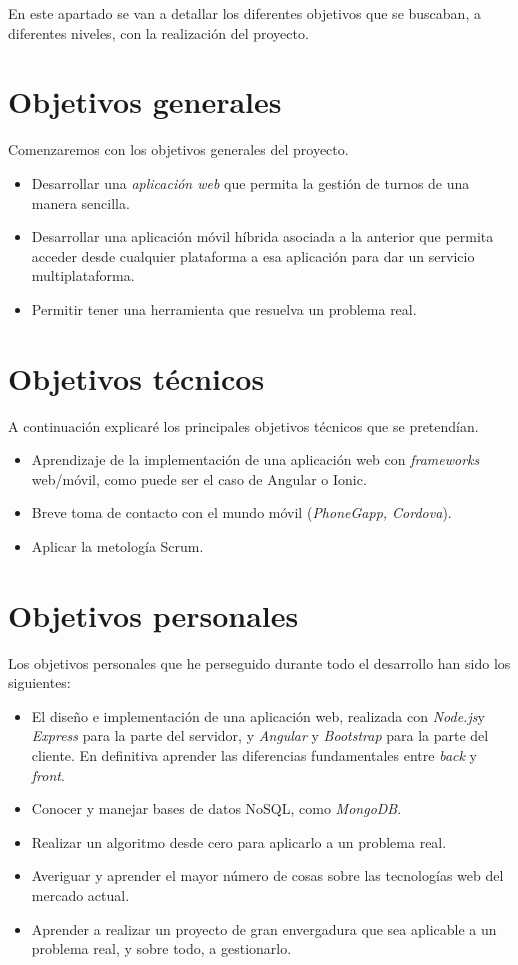
En este apartado se van a detallar los diferentes objetivos que se buscaban, a diferentes niveles, con la realización del proyecto.

\section{Objetivos generales}\label{objetivos-generales}
Comenzaremos con los objetivos generales del proyecto. 
\begin{itemize}
\tightlist
\item
  Desarrollar una  \emph{aplicación web} que permita la gestión de turnos de una manera sencilla. 
\item
  Desarrollar una aplicación móvil híbrida asociada a la anterior que permita acceder desde cualquier plataforma a esa aplicación para dar un servicio multiplataforma. 
\item
  Permitir tener una herramienta que resuelva un problema real.
\end{itemize}

\section{Objetivos técnicos}\label{objetivos-tecnicos}
A continuación explicaré los principales objetivos técnicos que se pretendían. 
\begin{itemize}
\tightlist
 \item
  Aprendizaje de la implementación de una aplicación web con \emph{frameworks} web/móvil, como puede ser el caso de Angular o Ionic. 
\item
  Breve toma de contacto con el mundo móvil (\emph{PhoneGapp, Cordova}).
\item
 Aplicar la metología Scrum.
\end{itemize}

\section{Objetivos personales}\label{objetivos-personales}
Los objetivos personales que he perseguido durante todo el desarrollo han sido los siguientes:
\begin{itemize}
\tightlist
\item
 El diseño e implementación de una aplicación web, realizada con \emph{Node.js}y \emph{Express} para la parte del
servidor, y \emph{Angular} y \emph{Bootstrap} para la parte del cliente.  En definitiva aprender las diferencias fundamentales entre \emph{back} y \emph{front}.
\item
  Conocer y manejar bases de datos NoSQL, como \emph{MongoDB}.
\item
  Realizar un algoritmo desde cero para aplicarlo a un problema real.
\item
  Averiguar y aprender el mayor número de cosas sobre las tecnologías web del mercado actual. 
\item
  Aprender a realizar un proyecto de gran envergadura que sea aplicable a un problema real, y sobre todo, a gestionarlo.
\end{itemize}

